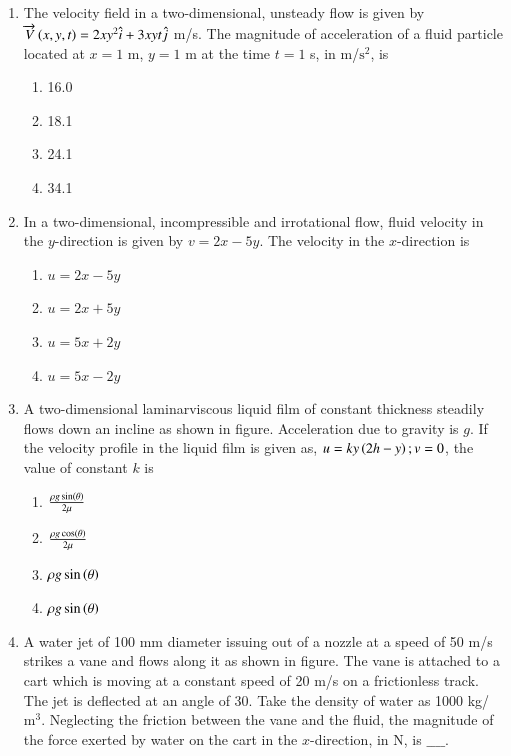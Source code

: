\documentclass[journal]{IEEEtran}
\begin{document}
\begin{enumerate}
\begin{enumerate}
\end{enumerate}
\item The velocity field in a two-dimensional, unsteady flow is given by $\overrightarrow{V}\left(x,y,t\right) = 2xy^2\hat{i} + 3xyt\hat{j}$ m/s. The magnitude of acceleration of a fluid particle located at $x = 1$ m, $y = 1$ m at the time $t = 1$ s, in m/$\text{s}^2$, is
\begin{enumerate}
    \item 16.0
    \item 18.1
     \item 24.1
    \item 34.1 \\
\end{enumerate}
\item In a two-dimensional, incompressible and irrotational flow, fluid velocity  in the $y$-direction is given by $v = 2x - 5y$. The velocity  in the $x$-direction is 
\begin{enumerate}
   \item $u = 2x - 5y$
   \item $u = 2x + 5y$
   \item $u = 5x + 2y$
   \item $u = 5x - 2y$ \\
\end{enumerate}
\item A two-dimensional laminarviscous liquid film of constant thickness  steadily flows down an incline as shown in figure. Acceleration due to gravity is $g$. If the velocity profile in the liquid film is given as, $u=ky\left(2h - y\right); v = 0$, the value of constant $k$ is
\begin{figure}[!ht]
\centering
\resizebox{0.5\textwidth}{!}{%

}%
\end{figure}
\begin{enumerate}
    \item $\frac{\rho g \sin\left(\theta\right)}{2\mu}$
    \item $\frac{\rho g \cos\left(\theta\right)}{2\mu}$
    \item $\rho g \sin\left(\theta\right)$
    \item $\rho g \sin\left(\theta\right)$ \\
\end{enumerate}
\item A water jet of 100 mm diameter issuing out of a nozzle at a speed of 50 m/s strikes a vane and flows along it as shown in figure. The vane is attached to a cart which is moving at a constant speed of 20 m/s on a frictionless track. The jet is deflected at an angle of 30\degree. Take the density of water as 1000 kg/$\text{m}^3$. Neglecting the friction between the vane and the fluid, the magnitude of the force exerted by water on the cart in the $x$-direction, in N, is $\_\_\_\_$. 

\end{enumerate}
\end{document}
